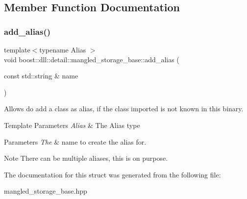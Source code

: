 \subsection{Member Function Documentation}
\mbox{\label{a01380_a34c6f14f96aef274e79f28dd4e1a10b2}} 
\subsubsection{\texorpdfstring{add\+\_\+alias()}{add\_alias()}}
{\footnotesize\ttfamily template$<$typename Alias $>$ \\
void boost\+::dll\+::detail\+::mangled\+\_\+storage\+\_\+base\+::add\+\_\+alias (\begin{DoxyParamCaption}\item[{const std\+::string \&}]{name }\end{DoxyParamCaption})\hspace{0.3cm}{\ttfamily [inline]}}

Allows do add a class as alias, if the class imported is not known in this binary. 
\begin{DoxyTemplParams}{Template Parameters}
{\em Alias} & The Alias type \\
\hline
\end{DoxyTemplParams}

\begin{DoxyParams}{Parameters}
{\em The} & name to create the alias for.\\
\hline
\end{DoxyParams}
\begin{DoxyNote}{Note}
There can be multiple aliases, this is on purpose. 
\end{DoxyNote}


The documentation for this struct was generated from the following file\+:\begin{DoxyCompactItemize}
\item 
mangled\+\_\+storage\+\_\+base.\+hpp\end{DoxyCompactItemize}
